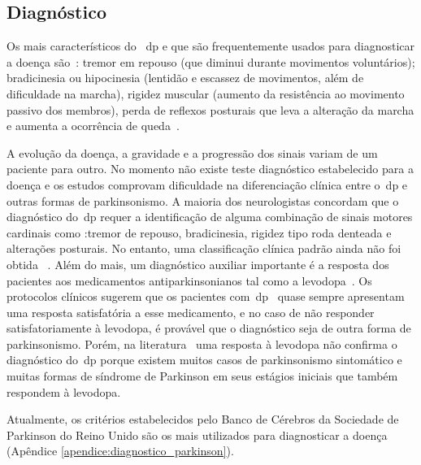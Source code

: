 \subsection{Diagnóstico}
Os mais característicos do ~\ac{dp} e que são frequentemente usados para diagnosticar a doença são~\cite{rowlandtratado}: tremor em repouso (que diminui durante movimentos voluntários); bradicinesia ou hipocinesia (lentidão e escassez de movimentos, além de dificuldade na marcha), rigidez muscular (aumento da resistência ao movimento passivo dos membros), perda de reflexos posturais que leva a alteração da marcha e aumenta a ocorrência de queda~\cite{rodrigues2006,tolosa06}. 

A evolução da doença, a gravidade e a progressão dos sinais variam de um paciente para outro. No momento não existe teste diagnóstico estabelecido para a doença e os estudos comprovam dificuldade na diferenciação clínica entre o~\ac{dp} e outras formas de parkinsonismo. A maioria dos neurologistas concordam que o diagnóstico do~\ac{dp} requer a identificação de alguma combinação de sinais motores cardinais como :tremor de repouso, bradicinesia, rigidez tipo roda denteada e alterações posturais. No entanto, uma classificação clínica padrão ainda não foi obtida ~\cite{protpar010}. Além do mais, um diagnóstico auxiliar importante é a resposta dos pacientes aos medicamentos antiparkinsonianos tal como a levodopa~\cite{protpar010}. Os protocolos clínicos sugerem que os pacientes com~\ac{dp}~\cite{protpar010} quase sempre apresentam uma resposta satisfatória a esse medicamento, e no caso de não responder satisfatoriamente à levodopa, é provável que o diagnóstico seja de outra forma de parkinsonismo. Porém, na 
literatura~\cite{rowlandtratado} uma resposta à levodopa não confirma o diagnóstico do~\ac{dp} porque existem muitos casos de parkinsonismo sintomático e muitas formas de síndrome de Parkinson em seus estágios iniciais que também respondem à levodopa. 

Atualmente, os critérios estabelecidos pelo Banco de Cérebros da Sociedade de Parkinson do Reino Unido são os mais utilizados para diagnosticar a doença~\cite{protpar010} (Apêndice \ref{apendice:diagnostico_parkinson}). 



